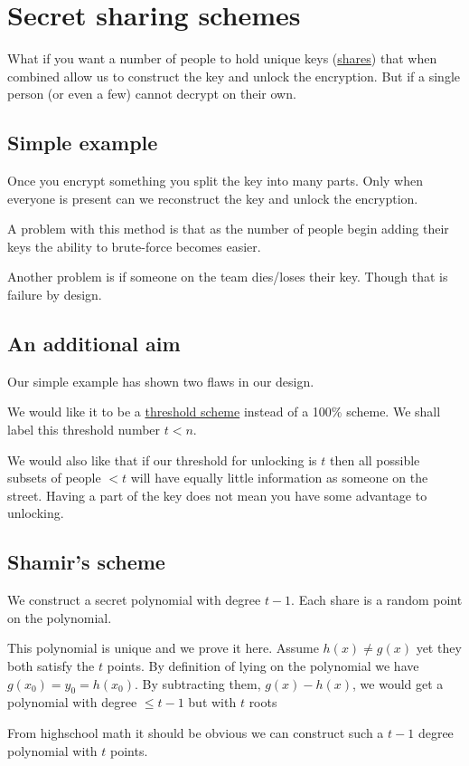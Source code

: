 \documentclass{report}
\begin{document}
\chapter{Secret sharing schemes}
What if you want a number of people to hold unique keys (\underline{shares})
that when combined
allow us to construct the key and unlock the encryption.
But if a single person (or even a few)
cannot decrypt on their own.

\section{Simple example}
Once you encrypt something you split the key into many parts. Only when
everyone is present can we reconstruct the key and unlock the encryption.

A problem with this method is that as the number of people begin adding their
keys the ability to brute-force becomes easier.

Another problem is if someone on the team dies/loses their key. Though that
is failure by design.

\section{An additional aim}
Our simple example has shown two flaws in our design.

We would like it to be a \underline{threshold scheme}
instead of a 100\% scheme. We shall label this threshold number $t < n$.

We would also like that if our threshold for unlocking is $t$ then all possible
subsets of people $< t$ will have equally little information as someone on the
street. Having a part of the key does not mean you have some advantage to
unlocking.

\section{Shamir's scheme}
We construct a secret polynomial with degree $t-1$. Each share is a random
point on the polynomial.

This polynomial is unique and we prove it here.
Assume $h(x) \neq g(x)$ yet they both satisfy the $t$ points. By
definition of lying on the polynomial we have $g(x_0) = y_0 = h(x_0)$. By
subtracting them, $g(x) - h(x)$, we would get a polynomial with degree
$\leq t-1$ but with $t$ roots

From highschool math it should be obvious we can construct such a $t-1$ degree
polynomial with $t$ points.
\end{document}
